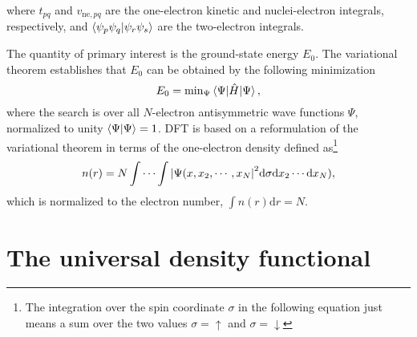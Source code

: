   where $t_{pq}$ and $v_{\mathrm{ne},pq}$ are the one-electron kinetic and
  nuclei-electron integrals, respectively, and
  $\bra{\psi_p\psi_q}\ket{\psi_r\psi_s}$ are the two-electron integrals.
\par The quantity of primary interest is the ground-state energy $E_0$. The
variational theorem establishes that $E_0$ can be obtained by the following
minimization
\begin{equation}
  E_0 = \mathrm{min}_{\Psi}\mel{\Psi}{\hat{H}}{\Psi},
\end{equation}
where the search is over all $N$-electron antisymmetric wave functions $\Psi$,
normalized to unity $\bra{\Psi}\ket{\Psi}= 1$. DFT is based on a reformulation of
the variational theorem in terms of the one-electron density defined
as\footnote{The integration over the spin coordinate $\sigma$ in the following
equation just means a sum over the two values $\sigma = \uparrow$ and $\sigma
= \downarrow$}
\begin{equation}
  n(r) = N\int\cdots\int
\abs{\Psi(x,x_2,\cdots,x_N}^2\mathrm{d}\sigma\mathrm{d}x_2\cdots\mathrm{d}x_N),
\end{equation}
which is normalized to the electron number, $\int n(r)\mathrm{d}r = N.$
\section{The universal density functional}

